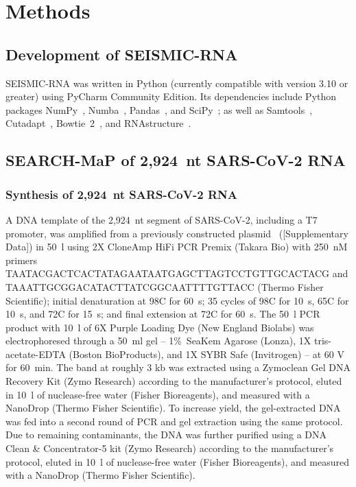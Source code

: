 \documentclass[main.tex]{subfiles}
\begin{document}
\section{Methods}
\label{methods}


\subsection{Development of SEISMIC-RNA}

SEISMIC-RNA was written in Python (currently compatible with version 3.10 or greater) using PyCharm Community Edition.
Its dependencies include Python packages NumPy~\cite{Harris2020}, Numba~\cite{Lam2015}, Pandas~\cite{McKinney2010,Reback2020}, and SciPy~\cite{Virtanen2020}; as well as Samtools~\cite{Li2009}, Cutadapt~\cite{Martin2011}, Bowtie~2~\cite{Langmead2012}, and RNAstructure~\cite{Reuter2010}.


\subsection{SEARCH-MaP of 2,924~nt SARS-CoV-2 RNA}

\subsubsection{Synthesis of 2,924~nt SARS-CoV-2 RNA}

A DNA template of the 2,924~nt segment of SARS-CoV-2, including a T7 promoter, was amplified from a previously constructed plasmid~\cite{Lan2022} ([Supplementary Data]) in 50~\textmu l using 2X CloneAmp HiFi PCR Premix (Takara Bio) with 250~nM primers TAATACGACTCACTATAGAATAATGAGCTTAGTCCTGTTGCACTACG and TAAATTGCGGACATACTTATCGGCAATTTTGTTACC (Thermo Fisher Scientific); initial denaturation at 98\textdegree C for 60~s; 35 cycles of 98\textdegree C for 10~s, 65\textdegree C for 10~s, and 72\textdegree C for 15~s; and final extension at 72\textdegree C for 60~s.
The 50~\textmu l PCR product with 10~\textmu l of 6X Purple Loading Dye (New England Biolabs) was electrophoresed through a 50~ml gel -- 1\%~SeaKem Agarose (Lonza), 1X tris-acetate-EDTA (Boston BioProducts), and 1X SYBR Safe (Invitrogen) -- at 60 V for 60~min.
The band at roughly 3 kb was extracted using a Zymoclean Gel DNA Recovery Kit (Zymo Research) according to the manufacturer's protocol, eluted in 10~\textmu l of nuclease-free water (Fisher Bioreagents), and measured with a NanoDrop (Thermo Fisher Scientific).
To increase yield, the gel-extracted DNA was fed into a second round of PCR and gel extraction using the same protocol.
Due to remaining contaminants, the DNA was further purified using a DNA Clean \& Concentrator-5 kit (Zymo Research) according to the manufacturer's protocol, eluted in 10~\textmu l of nuclease-free water (Fisher Bioreagents), and measured with a NanoDrop (Thermo Fisher Scientific).
\end{document}
